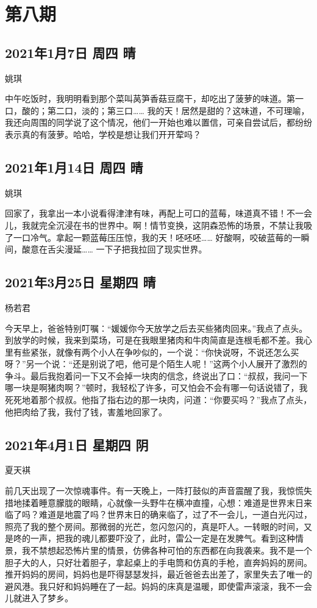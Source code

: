 \chapter{第八期}

\section{2021年1月7日 周四 晴}

姚琪

中午吃饭时，我明明看到那个菜叫莴笋香菇豆腐干，却吃出了菠萝的味道。第一口，酸的；第二口，淡的；第三口…… 我的天！居然是甜的？这味道，不可理喻，我还向周围的同学说了这个情况，他们一开始也难以置信，可亲自尝试后，都纷纷表示真的有菠萝。哈哈，学校是想让我们开开荤吗？

\section{2021年1月14日 周四 晴}

姚琪

回家了，我拿出一本小说看得津津有味，再配上可口的蓝莓，味道真不错！不一会儿，我就完全沉浸在书的世界中。啊！情节变换，这阴森恐怖的场景，不禁让我吸了一口冷气。拿起一颗蓝莓压压惊，我的天！呸呸呸…… 好酸啊，咬破蓝莓的一瞬间，酸意在舌尖漫延…… 一下子把我拉回了现实世界。

\section{2021年3月25日 星期四 晴}

杨若君

今天早上，爸爸特别叮嘱：“媛媛你今天放学之后去买些猪肉回来。”我点了点头。到放学的时候，我来到菜场，可是在我眼里猪肉和牛肉简直是连根毛都不差。我心里有些紧张，就像有两个小人在争吵似的，一个说：“你快说呀，不说还怎么买呀？”另一个说：“还是别说了吧，他可是个陌生人呢！”这两个小人展开了激烈的争斗。最后我抱着问一下又不会掉一块肉的信念，终说出了口：“叔叔，我问一下哪一块是啊猪肉啊？”顿时，我轻松了许多，可又怕会不会有哪一句话说错了，我死死地着那个叔叔。他指了指右边的那一块肉，问道：“你要买吗？”我点了点头，他把肉给了我，我付了钱，害羞地回家了。

\section{2021年4月1日 星期四 阴}

夏天褀

前几天出现了一次惊魂事件。有一天晚上，一阵打鼓似的声音震醒了我，我惊慌失措地揉着睡意朦胧的眼睛，心就像一头野牛在横冲直撞，心想：难道是世界末日来临了吗？难道是地震了吗？世界末日的确来临了，过了不一会儿，一道白光闪过，照亮了我的整个房间。那微弱的光芒，忽闪忽闪的，真是吓人。一转眼的时间，又是咚的一声，把我的魂儿都要吓没了，此时，雷公一定是在发脾气。看到这种情景，我不禁想起恐怖片里的情景，仿佛各种可怕的东西都在向我袭来。我不是一个胆子大的人，只好壮着胆子，拿起桌上的手电筒和仿真的手枪，直奔妈妈的房间。推开妈妈的房间，妈妈也是吓得瑟瑟发抖，最近爸爸去出差了，家里失去了唯一的避风港。我只好和妈妈睡在了一起。妈妈的床真是温暖，即使雷声滚滚，我不一会儿就进入了梦乡。

